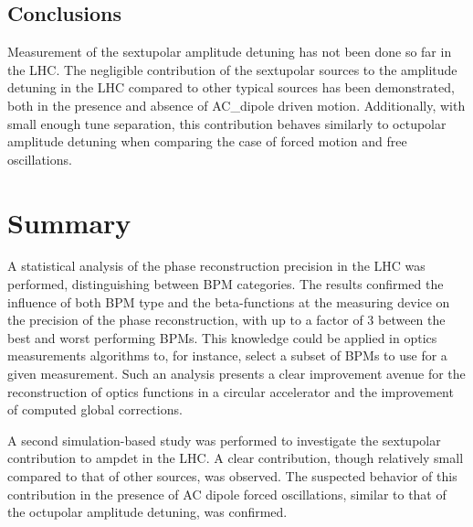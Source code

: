 \subsection*{Conclusions}

Measurement of the sextupolar amplitude detuning has not been done so far in the LHC.
The negligible contribution of the sextupolar sources to the amplitude detuning in the \gls{LHC} compared to other typical sources has been demonstrated, both in the presence and absence of \gls{AC_dipole} driven motion.
Additionally, with small enough tune separation, this contribution behaves similarly to octupolar amplitude detuning when comparing the case of forced motion and free oscillations.

\section{Summary}

A statistical analysis of the phase reconstruction precision in the \gls{LHC} was performed, distinguishing between \gls{BPM} categories.
The results confirmed the influence of both BPM type and the \glspl{beta-function} at the measuring device on the precision of the phase reconstruction, with up to a factor of \num{3} between the best and worst performing BPMs.
This knowledge could be applied in optics measurements algorithms to, for instance, select a subset of BPMs to use for a given measurement.
Such an analysis presents a clear improvement avenue for the reconstruction of optics functions in a circular accelerator and the improvement of computed global corrections.

A second simulation-based study was performed to investigate the sextupolar contribution to \gls{ampdet} in the LHC. %
A clear contribution, though relatively small compared to that of other sources, was observed.
The suspected behavior of this contribution in the presence of AC dipole forced oscillations, similar to that of the octupolar amplitude detuning, was confirmed.

\glsresetall                                     %
